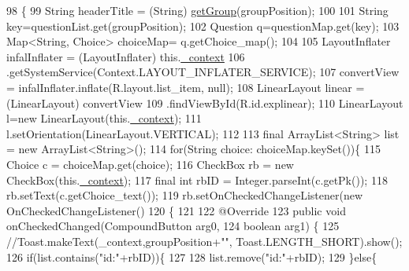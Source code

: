 \begin{DoxyCode}
98                                                                      \{
99         String headerTitle = (String) \hyperlink{classcom_1_1example_1_1qrpoll_1_1_expandable_list_adapter_a3f311ecc161915f1d8a864677d36b752}{getGroup}(groupPosition);
100      
101             String key=questionList.get(groupPosition);
102             Question q=questionMap.get(key);
103             Map<String, Choice> choiceMap= q.getChoice\_map();
104             
105             LayoutInflater infalInflater = (LayoutInflater) this.\hyperlink{classcom_1_1example_1_1qrpoll_1_1_expandable_list_adapter_a7a712744eebf94bc189b44e5d04ff7da}{\_context}
106                     .getSystemService(Context.LAYOUT\_INFLATER\_SERVICE);
107             convertView = infalInflater.inflate(R.layout.list\_item, null);
108             LinearLayout linear = (LinearLayout) convertView
109                     .findViewById(R.id.explinear);
110             LinearLayout l=\textcolor{keyword}{new} LinearLayout(this.\hyperlink{classcom_1_1example_1_1qrpoll_1_1_expandable_list_adapter_a7a712744eebf94bc189b44e5d04ff7da}{\_context});
111             l.setOrientation(LinearLayout.VERTICAL);
112             
113             \textcolor{keyword}{final} ArrayList<String> list = \textcolor{keyword}{new} ArrayList<String>();
114             \textcolor{keywordflow}{for}(String choice: choiceMap.keySet())\{
115                 Choice c = choiceMap.get(choice);
116                 CheckBox rb = \textcolor{keyword}{new} CheckBox(this.\hyperlink{classcom_1_1example_1_1qrpoll_1_1_expandable_list_adapter_a7a712744eebf94bc189b44e5d04ff7da}{\_context});
117                 \textcolor{keyword}{final} \textcolor{keywordtype}{int} rbID = Integer.parseInt(c.getPk());
118                 rb.setText(c.getChoice\_text());
119                 rb.setOnCheckedChangeListener(\textcolor{keyword}{new} OnCheckedChangeListener()
120                 \{
121 
122                     @Override
123                     \textcolor{keyword}{public} \textcolor{keywordtype}{void} onCheckedChanged(CompoundButton arg0,
124                             \textcolor{keywordtype}{boolean} arg1) \{
125                         \textcolor{comment}{//Toast.makeText(\_context,groupPosition+"", Toast.LENGTH\_SHORT).show();}
126                         \textcolor{keywordflow}{if}(list.contains(\textcolor{stringliteral}{"id:"}+rbID))\{
127                             
128                             list.remove(\textcolor{stringliteral}{"id:"}+rbID);
129                         \}\textcolor{keywordflow}{else}\{

\end{DoxyCode}
